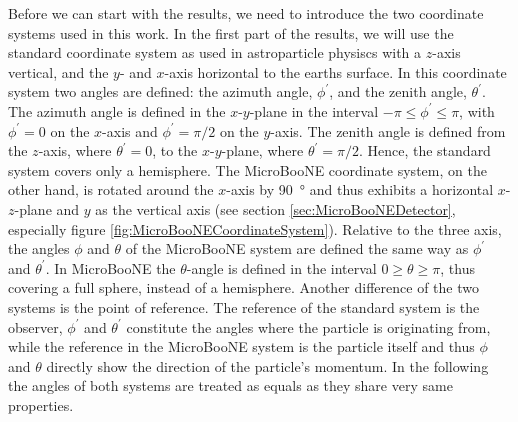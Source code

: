 Before we can start with the results, we need to introduce the two coordinate systems used in this work. In the first part of the results, we will use the standard coordinate system as used in astroparticle physiscs with a $z$-axis vertical, and the $y$- and $x$-axis horizontal to the earths surface. In this coordinate system two angles are defined: the azimuth angle, $\phi^{\prime}$, and the zenith angle, $\theta^{\prime}$. The azimuth angle is defined in the $x$-$y$-plane in the interval $-\pi \leq \phi^{\prime} \leq \pi$, with $\phi^\prime = 0$ on the $x$-axis and $\phi^\prime = \pi/2$ on the $y$-axis. The zenith angle is defined from the $z$-axis, where $\theta^\prime = 0$, to the $x$-$y$-plane, where $\theta^\prime = \pi/2$. Hence, the standard system covers only a hemisphere. The MicroBooNE coordinate system, on the other hand, is rotated around the $x$-axis by \SI{90}{\degree} and thus exhibits a horizontal $x$-$z$-plane and $y$ as the vertical axis (see section \ref{sec:MicroBooNEDetector}, especially figure \ref{fig:MicroBooNECoordinateSystem}). Relative to the three axis, the angles $\phi$ and $\theta$ of the MicroBooNE system are defined the same way as $\phi^{\prime}$ and $\theta^{\prime}$. In MicroBooNE the $\theta$-angle is defined in the interval $0 \geq \theta \geq \pi$, thus covering a full sphere, instead of a hemisphere. Another difference of the two systems is the point of reference. The reference of the standard system is the observer, \ie $\phi^\prime$ and $\theta^\prime$ constitute the angles where the particle is originating from, while the reference in the MicroBooNE system is the particle itself and thus $\phi$ and $\theta$ directly show the direction of the particle's momentum. In the following the angles of both systems are treated as equals as they share very same properties.

